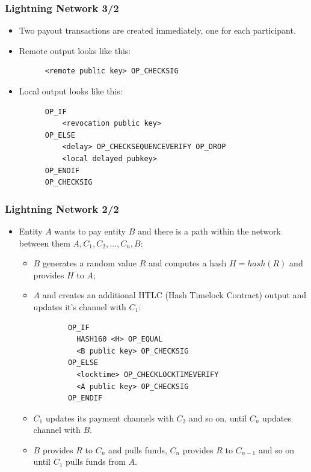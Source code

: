 \documentclass{beamer}
\begin{document}
\begin{frame}[fragile]
  \frametitle{Lightning Network 3/2}
  \begin{itemize}
  \item Two payout transactions are created immediately, one for each
    participant.
  \item Remote output looks like this:
    \begin{verbatim}
      <remote public key> OP_CHECKSIG
    \end{verbatim}
  \item Local output looks like this:
    \begin{verbatim}
      OP_IF
          <revocation public key>
      OP_ELSE
          <delay> OP_CHECKSEQUENCEVERIFY OP_DROP
          <local delayed pubkey>
      OP_ENDIF
      OP_CHECKSIG          
    \end{verbatim}
  \end{itemize}
\end{frame}


\begin{frame}[fragile]
  \frametitle{Lightning Network 2/2}
  \begin{itemize}
  \item Entity $A$ wants to pay entity $B$ and there is a path within the network
    between them $A, C_1, C_2, ..., C_n, B$:
    \begin{itemize}
    \item $B$ generates a random value $R$ and computes a hash $H = hash(R)$ and
      provides $H$ to $A$;
    \item $A$ and creates an additional HTLC (Hash Timelock Contract) output and
      updates it's channel with $C_1$:
      \begin{verbatim}
        OP_IF
          HASH160 <H> OP_EQUAL
          <B public key> OP_CHECKSIG
        OP_ELSE
          <locktime> OP_CHECKLOCKTIMEVERIFY
          <A public key> OP_CHECKSIG
        OP_ENDIF
      \end{verbatim}
    \item $C_1$ updates its payment channels with $C_2$ and so on, until $C_n$
      updates channel with $B$.
    \item $B$ provides $R$ to $C_n$ and pulls funds, $C_n$ provides $R$ to
      $C_{n-1}$ and so on until $C_1$ pulls funds from $A$.
    \end{itemize}
  \end{itemize}
\end{frame}
\end{document}
